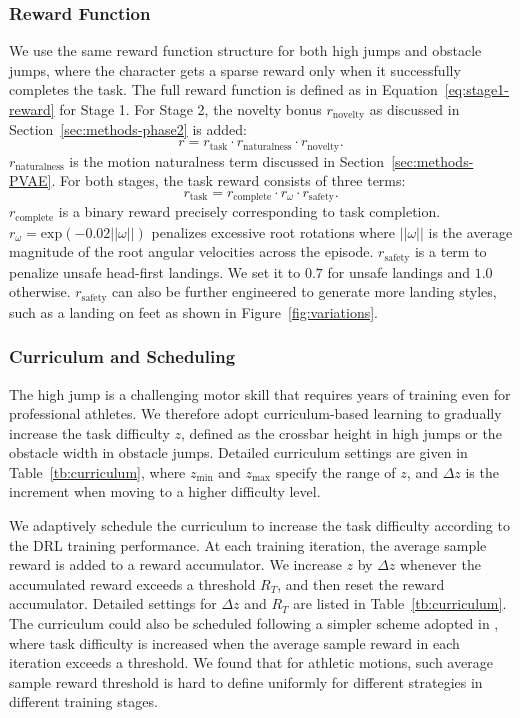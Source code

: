 \subsubsection{Reward Function}
\label{sec:Experiments-Reward}
We use the same reward function structure for both high jumps and obstacle jumps, where the character gets a sparse reward only when it successfully completes the task. The full reward function is defined as in Equation~\ref{eq:stage1-reward} for Stage 1. For Stage 2, the novelty bonus $r_\text{novelty}$ as discussed in Section~\ref{sec:methods-phase2} is added:
\begin{equation}
    r = r_\text{task}\cdot r_\text{naturalness}\cdot r_\text{novelty}.
    \label{eq:stage2-reward}
\end{equation}
$r_\text{naturalness}$ is the motion naturalness term discussed in Section~\ref{sec:methods-PVAE}. For both stages, the task reward consists of three terms:
\begin{equation}
    r_\text{task} = r_{\text{complete}} \cdot r_{\omega} \cdot r_\text{safety}.
\end{equation}
$r_\text{complete}$ is a binary reward precisely corresponding to task completion. $r_{\omega} = \text{exp}(-0.02 ||\omega||)$ penalizes excessive root rotations where $||\omega||$ is the average magnitude of the root angular velocities across the episode. $r_\text{safety}$ is a term to penalize unsafe head-first landings. We set it to $0.7$ for unsafe landings and $1.0$ otherwise. $r_\text{safety}$ can also be further engineered to generate more landing styles, such as a landing on feet as shown in Figure~\ref{fig:variations}.

\subsubsection{Curriculum and Scheduling}
\label{sec:Experiments-Curriculum}
The high jump is a challenging motor skill that requires years of training even for professional athletes. We therefore adopt curriculum-based learning to gradually increase the task difficulty $z$, defined as the crossbar height in high jumps or the obstacle width in obstacle jumps. Detailed curriculum settings are given in Table~\ref{tb:curriculum}, where $z_\text{min}$ and $z_\text{max}$ specify the range of $z$, and $\Delta z$ is the increment when moving to a higher difficulty level.

We adaptively schedule the curriculum to increase the task difficulty according to the DRL training performance. At each training iteration, the average sample reward is added to a reward accumulator. We increase $z$ by $\Delta z$ whenever the accumulated reward exceeds a threshold $R_T$, and then reset the reward accumulator. Detailed settings for $\Delta z$ and $R_T$ are listed in Table~\ref{tb:curriculum}. The curriculum could also be scheduled following a simpler scheme adopted in \cite{Xie2020allsteps}, where task difficulty is increased when the average sample reward in each iteration exceeds a threshold. We found that for athletic motions, such average sample reward threshold is hard to define uniformly for different strategies in different training stages.

